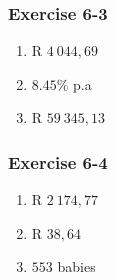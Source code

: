 \begin{multicols}{3}
\subsubsection*{Exercise 6-3} %
    \begin{enumerate}[label=\textbf{\arabic*}.]
	\item R $4 ~044,69$%

	\item $8.45\%$ p.a%

	\item R $59 ~345,13$%
    \end{enumerate}

\subsubsection*{Exercise 6-4} %
    \begin{enumerate}[label=\textbf{\arabic*}.]
	\item R $2~ 174,77$%

	\item R $38,64$%

	\item $553$ babies%
    \end{enumerate}


\end{multicols}

